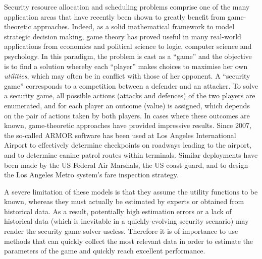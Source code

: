 Security resource allocation and scheduling problems comprise one of the many application areas that have recently been shown to greatly benefit from game-theoretic approaches. Indeed, as a solid mathematical framework to model strategic decision making, game theory has proved useful in many real-world applications from economics and political science to logic, computer science and psychology. In this paradigm, the problem is cast as a ``game'' and the objective is to find a solution whereby each ``player'' makes choices to maximise her own \textit{utilities}, which may often be in conflict with those of her opponent. A ``security game'' corresponds to a competition between a defender and an attacker. To solve a security game, all possible actions (attacks and defences) of the two players are enumerated, and for each player an outcome (value) is assigned, which depends on the pair of actions taken by both players. In cases where these outcomes are known, game-theoretic approaches have provided impressive results. Since 2007, the so-called ARMOR software \cite{pita2008deployed} has been used at Los Angeles International Airport to effectively determine checkpoints on roadways leading to the airport, and to determine canine patrol routes within terminals. Similar deployments have been made by the US Federal Air Marshals, the US coast guard, and to design the Los Angeles Metro system's fare inspection strategy\cite{tsai2009iris,shieh2012protect,yin2012trusts}. 

A severe limitation of these models is that they assume the utility functions to be known, whereas they must actually be estimated by experts or obtained from historical data. As a result, potentially high estimation errors or a lack of historical data (which is inevitable in a quickly-evolving security scenario) may render the security game solver useless. 
Therefore it is of importance to use methods that can quickly collect the most relevant data  in order to estimate the parameters of the game and quickly reach excellent performance.

